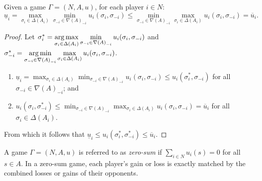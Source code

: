 	\begin{proposition}
		Given a game $\Gamma = (N, A, u)$, for each player $i \in N$:
		\[\underline{u}_i = \max_{\sigma_i \in \Delta(A_i)}\min_{\sigma_{-i} \in {\nabla(A)}_{-i}} u_i(\sigma_i, \sigma_{-i}) \leq \min_{\sigma_{-i} \in {\nabla(A)}_{-i}}\max_{\sigma_i \in \Delta(A_i)} u_i(\sigma_i, \sigma_{-i}) = \overline{u}_i.\]
		
		\begin{proof}
			Let $\sigma^*_i = \displaystyle\operatorname*{arg\,max}_{\sigma_i \in \Delta(A_i)}\min_{\sigma_{-i} \in {\nabla(A)}_{-i}} u_i(\sigma_i, \sigma_{-i})$ and $\sigma^*_{-i} = \displaystyle\operatorname*{arg\,min}_{\sigma_{-i} \in {\nabla(A)}_{-i}}\max_{\sigma_i \in \Delta(A_i)} u_i(\sigma_i, \sigma_{-i})$.
			
			\begin{enumerate}
				\item $\underline{u}_i = \displaystyle\max_{\sigma_i \in \Delta(A_i)}\min_{\sigma_{-i} \in {\nabla(A)}_{-i}} u_i(\sigma_i, \sigma_{-i}) \leq u_i(\sigma^*_i, \sigma_{-i})$ for all $\sigma_{-i} \in {\nabla(A)}_{-i}$; and
				\item $u_i(\sigma_i, \sigma^*_{-i}) \leq \displaystyle\min_{\sigma_{-i} \in {\nabla(A)}_{-i}}\max_{\sigma_i \in \Delta(A_i)} u_i(\sigma_i, \sigma_{-i}) = \overline{u}_i$ for all $\sigma_i \in \Delta(A_i)$.
			\end{enumerate}
			
			From which it follows that $\underline{u}_i \leq u_i(\sigma^*_i, \sigma^*_{-i}) \leq \overline{u}_i$.
		\end{proof}
	\end{proposition}
	
	A game $\Gamma = (N, A, u)$ is referred to as \textit{zero-sum} if $\sum_{i \in N} u_i(s) = 0$ for all $s \in A$. In a zero-sum game, each player's gain or loss is exactly matched by the combined losses or gains of their opponents. 
	

